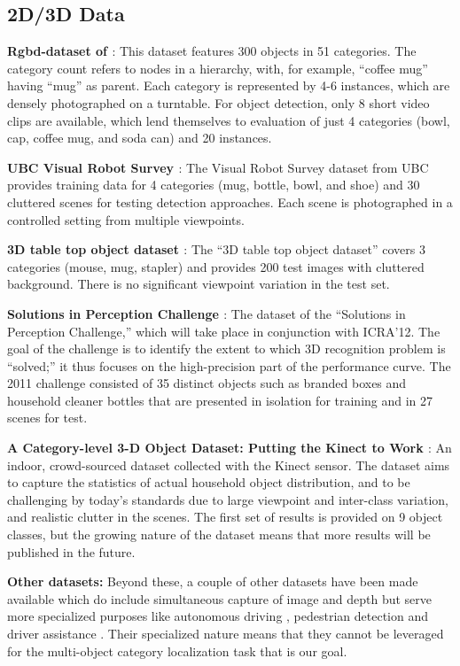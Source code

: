 \subsection{2D/3D Data}
{\bf Rgbd-dataset of \cite{Lai2011}}:
This dataset features 300 objects in 51 categories.
The category count refers to nodes in a hierarchy, with, for example, ``coffee mug'' having ``mug'' as parent.
Each category is represented by 4-6 instances, which are densely photographed on a turntable.
For object detection, only 8 short video clips are available, which lend themselves to evaluation of just 4 categories (bowl, cap, coffee mug, and soda can) and 20 instances.

{\bf UBC Visual Robot Survey \cite{Helmer2010}}:
The Visual Robot Survey dataset from UBC provides training data for 4 categories (mug, bottle, bowl, and shoe) and 30 cluttered scenes for testing detection approaches.
Each scene is photographed in a controlled setting from multiple viewpoints.

{\bf 3D table top object dataset \cite{Sun2010}}:
The ``3D table top object dataset'' covers 3 categories (mouse, mug, stapler) and provides 200 test images with cluttered background.
There is no significant viewpoint variation in the test set.

{\bf Solutions in Perception Challenge \cite{SIPC2011}}:
The dataset of the ``Solutions in Perception Challenge,'' which will take place in conjunction with ICRA'12.
The goal of the challenge is to identify the extent to which 3D recognition problem is ``solved;'' it thus focuses on the high-precision part of the performance curve.
The 2011 challenge consisted of 35 distinct objects such as branded boxes and household cleaner bottles that are presented in isolation for training and in 27 scenes for test.

{\bf A Category-level 3-D Object Dataset: Putting the Kinect to Work \cite{Janoch2011}}:
An indoor, crowd-sourced dataset collected with the Kinect sensor.
The dataset aims to capture the statistics of actual household object distribution, and to be challenging by today's standards due to large viewpoint and inter-class variation, and realistic clutter in the scenes.
The first set of results is provided on 9 object classes, but the growing nature of the dataset means that more results will be published in the future.

{\bf Other datasets:} Beyond these, a couple of other datasets have been made available which do include simultaneous capture of image and depth but serve more specialized purposes like autonomous driving \cite{ford_dataset}, pedestrian detection \cite{leibe10ijrr} and driver assistance \cite{walk10eccv}.
Their specialized nature means that they cannot be leveraged for the multi-object category localization task that is our goal.

